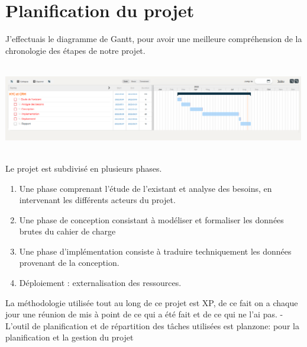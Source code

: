 \section{Planification du projet}
J'effectuais le diagramme de Gantt, pour avoir une meilleure compréhension de la chronologie des étapes de notre projet.
\newline
\newline
\includegraphics[width=500px,height=175px]{./Template LaTeX/Images/gantt.png}
\newline
Le projet est subdivisé en plusieurs phases.
\begin{enumerate}
\item Une phase comprenant l’étude de l’existant et analyse des besoins, en
intervenant les différents acteurs du projet.
\item Une phase de conception consistant à modéliser et formaliser les
données brutes du cahier de charge
\item Une phase d’implémentation consiste à traduire techniquement les
données provenant de la conception.
\item Déploiement : externalisation des ressources.
\end{enumerate}
\newline
La méthodologie utilisée tout au long de ce projet est XP, de ce fait on a
chaque jour une réunion de mis à point de ce qui a été fait et de ce qui
ne l’ai pas.
-L’outil de planification et de répartition des tâches utilisées est planzone:
pour la planification et la gestion du projet

